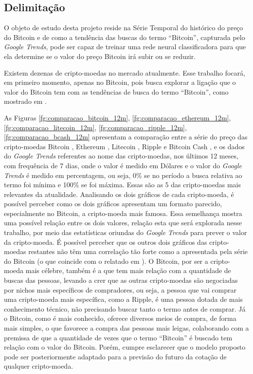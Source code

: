 \subsection{Delimitação}

O objeto de estudo desta projeto reside na Série Temporal do histórico do preço do Bitcoin e de como a tendência das buscas do termo ``Bitcoin'', capturada pelo \textit{Google Trends}, pode ser capaz de treinar uma rede neural classificadora para que ela determine se o valor do preço Bitcoin irá subir ou se reduzir.

Existem dezenas de cripto-moedas no mercado atualmente. Esse trabalho focará, em primeiro momento, apenas no Bitcoin, pois busca explorar a ligação que o valor do Bitcoin tem com as tendências de busca do termo ``Bitcoin'', como mostrado em \cite{matta2015bitcoin}. 

As Figuras \ref{fg:comparacao_bitcoin_12m}, \ref{fg:comparacao_ethereum_12m}, \ref{fg:comparacao_litecoin_12m}, \ref{fg:comparacao_ripple_12m}, \ref{fg:comparacao_bcash_12m} apresentam a comparação entre a série do preço das cripto-moedas Bitcoin \cite{nakamoto2008bitcoin}, Ethereum \cite{Ethereum}, Litecoin \cite{Litecoin}, Ripple \cite{Ripple} e Bitcoin Cash \cite{BitcoinCash}, e os dados do \textit{Google Trends} referentes ao nome das cripto-moedas, nos últimos 12 meses, com frequência de 7 dias, onde o valor é medido em Dólares e o valor do \textit{Google Trends} é medido em percentagem, ou seja, 0\% se no período a busca relativa ao termo foi mínima e 100\% se foi máxima. Essas são as 5 das cripto-moedas mais relevantes da atualidade. 
Analisando os dois gráficos de cada cripto-moeda, é possível perceber como os dois gráficos apresentam um formato parecido, especialmente no Bitcoin, a cripto-moeda mais famosa. Essa semelhança mostra uma possível relação entre os dois valores, relação esta que será explorada nesse trabalho, por meio das estatísticas oriundas do \textit{Google Trends} para prever o valor da cripto-moeda. É possível perceber que os outros dois gráficos das cripto-moedas restantes não têm uma correlação tão forte como a apresentada pela série do Bitcoin (o que coincide com o relatado em \cite{matta2015bitcoin}). O Bitcoin, por ser a cripto-moeda mais célebre, também é a que tem mais relação com a quantidade de buscas das pessoas, levando a crer que as outras cripto-moedas são negociadas por nichos mais específicos de compradores, ou seja, a pessoa que vai comprar uma cripto-moeda mais específica, como a Ripple, é uma pessoa dotada de mais conhecimento técnico, não precisando buscar tanto o termo antes de comprar. Já o Bitcoin, como é mais conhecido, oferece diversos meios de compra, de forma mais simples, o que favorece a compra das pessoas mais leigas, colaborando com a premissa de que a quantidade de vezes que o termo ``Bitcoin'' é buscado tem relação com o valor do Bitcoin. Porém, cumpre esclarecer que o modelo proposto pode ser posteriormente adaptado para a previsão do futuro da cotação de qualquer cripto-moeda.

